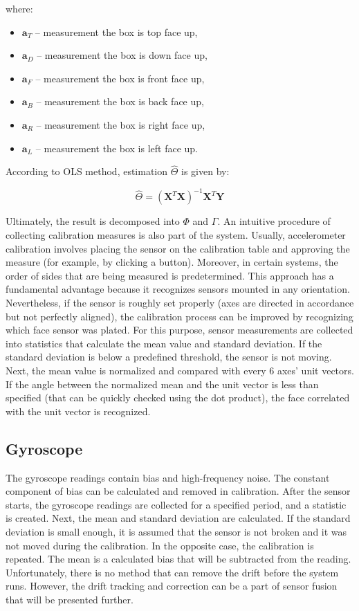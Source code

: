 where:
\begin{itemize}
	\item $\bm{a}_T$ -- measurement the box is top face up,
	\item $\bm{a}_D$ -- measurement the box is down face up,
	\item $\bm{a}_F$ -- measurement the box is front face up,
	\item $\bm{a}_B$ -- measurement the box is back face up,
	\item $\bm{a}_R$ -- measurement the box is right face up,
	\item $\bm{a}_L$ -- measurement the box is left face up.
\end{itemize}

According to OLS method, estimation $\bm{\hat{\varTheta}}$ is given by:

\begin{equation}
	\bm{\hat{\varTheta}} = \left( \bm{X}^T \bm{X} \right)^{-1} \bm{X}^T \bm{Y}
	\label{ols_est}
\end{equation}

Ultimately, the result is decomposed into $\bm{\varPhi}$ and $\bm{\varGamma}$. An intuitive procedure of collecting calibration measures is also part of the system. Usually, accelerometer calibration involves placing the sensor on the calibration table and approving the measure (for example, by clicking a button). Moreover, in certain systems, the order of sides that are being measured is predetermined. This approach has a fundamental advantage because it recognizes sensors mounted in any orientation. Nevertheless, if the sensor is roughly set properly (axes are directed in accordance but not perfectly aligned), the calibration process can be improved by recognizing which face sensor was plated. For this purpose, sensor measurements are collected into statistics that calculate the mean value and standard deviation. If the standard deviation is below a predefined threshold, the sensor is not moving. Next, the mean value is normalized and compared with every 6 axes’ unit vectors. If the angle between the normalized mean and the unit vector is less than specified (that can be quickly checked using the dot product), the face correlated with the unit vector is recognized.



\subsection{Gyroscope}

The gyroscope readings contain bias and high-frequency noise. The constant component of bias can be calculated and removed in calibration. After the sensor starts, the gyroscope readings are collected for a specified period, and a statistic is created. Next, the mean and standard deviation are calculated. If the standard deviation is small enough, it is assumed that the sensor is not broken and it was not moved during the calibration. In the opposite case, the calibration is repeated. The mean is a calculated bias that will be subtracted from the reading. Unfortunately, there is no method that can remove the drift before the system runs. However, the drift tracking and correction can be a part of sensor fusion that will be presented further.


